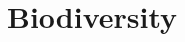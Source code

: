 \documentclass[../summary.tex]{subfiles}
\begin{document}
	
	\section{Biodiversity}
	
\end{document}
